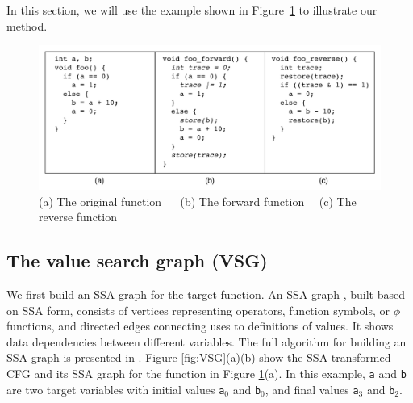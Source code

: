 In this section, we will use the example shown in Figure~\ref{fig:code_example} to illustrate our method.


\begin{figure}
\centering
\includegraphics[width=430pt]{figures1/CodeExample.pdf}
\caption{(a) The original function $\quad$ (b) The forward function$\quad$ (c) The reverse function}
\label{fig:code_example}
\end{figure}

\subsection{The value search graph (VSG)}
We first build an SSA graph for the target function.
An SSA graph \cite{Alpern1988,Cooper2001}, built based on SSA form, consists of vertices representing operators, function symbols, or $\phi$ functions, and directed edges connecting uses to definitions of values. It shows data dependencies between different variables. 
The full algorithm for building an SSA graph is presented in \cite{Muchnick}. 
Figure \ref{fig:VSG}(a)(b) show the SSA-transformed CFG and its SSA graph for the function in Figure \ref{fig:code_example}(a). In this example, \texttt{a} and \texttt{b} are two target variables with initial values \texttt{a$_0$} and \texttt{b$_0$}, and final values \texttt{a$_3$} and \texttt{b$_2$}.

